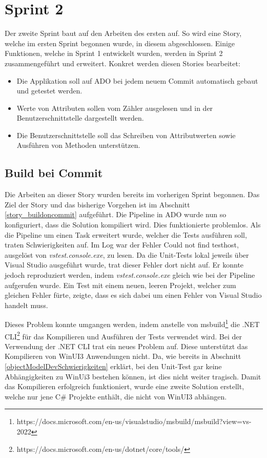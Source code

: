 \section{Sprint 2}
Der zweite Sprint baut auf den Arbeiten des ersten auf.
So wird eine Story, welche im ersten Sprint begonnen wurde, in diesem abgeschlossen.
Einige Funktionen, welche in Sprint 1 entwickelt wurden, werden in Sprint 2 zusammengeführt und erweitert.
Konkret werden diesen Stories bearbeitet:
\begin{itemize}
   \item Die Applikation soll auf \ac{ADO} bei jedem neuem Commit automatisch gebaut und getestet werden. 
   \item Werte von Attributen sollen vom Zähler ausgelesen und in der Benutzerschnittstelle dargestellt werden.
   \item Die Benutzerschnittstelle soll das Schreiben von Attributwerten sowie Ausführen von Methoden unterstützen.
\end{itemize}


\subsection{Build bei Commit}\label{s2:buildOnCommit}
Die Arbeiten an dieser Story wurden bereits im vorherigen Sprint begonnen.
Das Ziel der Story und das bisherige Vorgehen ist im Abschnitt \ref{story_buildoncommit} aufgeführt.
Die Pipeline in \ac{ADO} wurde nun so konfiguriert, dass die Solution kompiliert wird.
Dies funktionierte problemlos.
Als die Pipeline um einen Task erweitert wurde, welcher die Tests ausführen soll, traten Schwierigkeiten auf.
Im Log war der Fehler \dq  Could not find testhost\dq , ausgelöst von \textit{vstest.console.exe}, zu lesen.
Da die Unit-Tests lokal jeweils über Visual Studio ausgeführt wurde, trat dieser Fehler dort nicht auf.
Er konnte jedoch reproduziert werden, indem \textit{vstest.console.exe} gleich wie bei der Pipeline aufgerufen wurde.
Ein Test mit einem neuen, leeren Projekt, welcher zum gleichen Fehler fürte, zeigte, dass es sich dabei um einen Fehler von Visual Studio handelt muss.

Dieses Problem konnte umgangen werden, indem anstelle von msbuild\footnote{https://docs.microsoft.com/en-us/visualstudio/msbuild/msbuild?view=vs-2022}
die .NET CLI\footnote{https://docs.microsoft.com/en-us/dotnet/core/tools/} für das Kompilieren und Ausführen der Tests verwendet wird.
Bei der Verwendung der .NET CLI trat ein neues Problem auf.
Diese unterstützt das Kompilieren von WinUI3 Anwendungen nicht.
Da, wie bereits in Abschnitt \ref{objectModelDevSchwierigkeiten} erklärt, bei den Unit-Test gar keine Abhängigkeiten zu WinUi3 bestehen können, ist dies nicht weiter tragisch.
Damit das Kompilieren erfolgreich funktioniert, wurde eine zweite Solution erstellt, welche nur jene C\# Projekte enthält, die nicht von WinUI3 abhängen.

